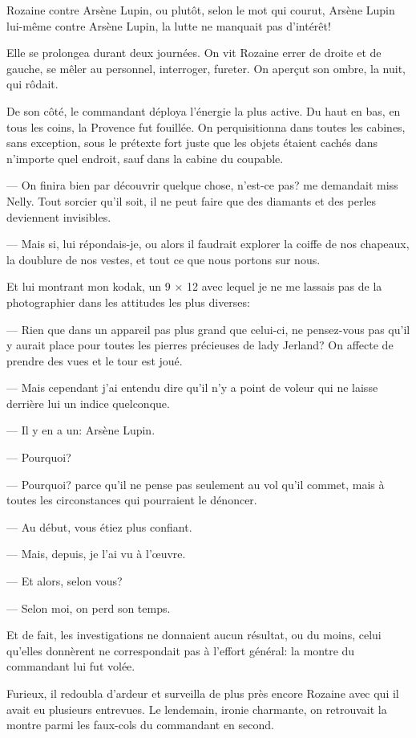 \documentclass[12pt,a4paper]{article}
\begin{document}
Rozaine contre Arsène Lupin, ou plutôt, selon le mot qui courut, Arsène Lupin lui-même contre Arsène Lupin, la lutte ne manquait pas d’intérêt!

Elle se prolongea durant deux journées. On vit Rozaine errer de droite et de gauche, se mêler au personnel, interroger, fureter. On aperçut son ombre, la nuit, qui rôdait.

De son côté, le commandant déploya l’énergie la plus active. Du haut en bas, en tous les coins, la Provence fut fouillée. On perquisitionna dans toutes les cabines, sans exception, sous le prétexte fort juste que les objets étaient cachés dans n’importe quel endroit, sauf dans la cabine du coupable.

— On finira bien par découvrir quelque chose, n’est-ce pas? me demandait miss Nelly. Tout sorcier qu’il soit, il ne peut faire que des diamants et des perles deviennent invisibles.

— Mais si, lui répondais-je, ou alors il faudrait explorer la coiffe de nos chapeaux, la doublure de nos vestes, et tout ce que nous portons sur nous.

Et lui montrant mon kodak, un 9 × 12 avec lequel je ne me lassais pas de la photographier dans les attitudes les plus diverses:

— Rien que dans un appareil pas plus grand que celui-ci, ne pensez-vous pas qu’il y aurait place pour toutes les pierres précieuses de lady Jerland? On affecte de prendre des vues et le tour est joué.

— Mais cependant j’ai entendu dire qu’il n’y a point de voleur qui ne laisse derrière lui un indice quelconque.

— Il y en a un: Arsène Lupin.

— Pourquoi?

— Pourquoi? parce qu’il ne pense pas seulement au vol qu’il commet, mais à toutes les circonstances qui pourraient le dénoncer.

— Au début, vous étiez plus confiant.

— Mais, depuis, je l’ai vu à l’œuvre.

— Et alors, selon vous?

— Selon moi, on perd son temps.

Et de fait, les investigations ne donnaient aucun résultat, ou du moins, celui qu’elles donnèrent ne correspondait pas à l’effort général: la montre du commandant lui fut volée.

Furieux, il redoubla d’ardeur et surveilla de plus près encore Rozaine avec qui il avait eu plusieurs entrevues. Le lendemain, ironie charmante, on retrouvait la montre parmi les faux-cols du commandant en second.
\end{document}

